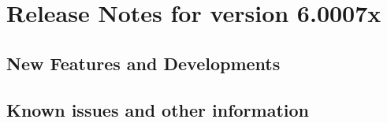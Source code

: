 \section{Release Notes for \app{} version 6.0007x}

\subsection{New Features and Developments}


\subsection{Known issues and other information}

